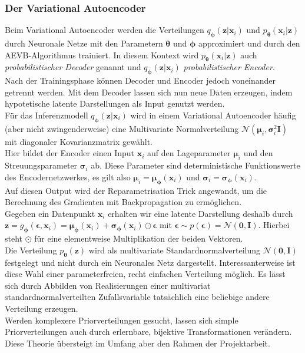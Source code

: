 \documentclass[12pt]{article}
\newcommand{\qenc}{q_{\boldsymbol\phi}(\mathbf{z}|\mathbf{x}_i)}
\newcommand{\pdec}{p_{\boldsymbol\theta}(\mathbf{x}_i|\mathbf{z})}
\newcommand{\z}{\mathbf{z}}
\begin{document}
	\subsubsection[Variational Autoencoder]{Der Variational Autoencoder}
	Beim Variational Autoencoder werden die Verteilungen $\qenc$ und $\pdec$ durch Neuronale Netze mit den Parametern $\boldsymbol\theta$ und $\boldsymbol\phi$ approximiert und durch den AEVB-Algorithmus trainiert. In diesem Kontext wird $\pdec$ auch \emph{probabilistischer Decoder} genannt und $\qenc$ \emph{probabilistischer Encoder}. \\
	Nach der Trainingsphase können Decoder und Encoder jedoch voneinander getrennt werden. Mit dem Decoder lassen sich nun neue Daten erzeugen, indem hypotetische latente Darstellungen als Input genutzt werden.\\
	Für das Inferenzmodell $\qenc$ wird in einem Variational Autoencoder häufig (aber nicht zwingenderweise) eine Multivariate Normalverteilung $\mathcal{N}(\boldsymbol\mu_{i},\boldsymbol\sigma_{i}^{2}\mathbf{I})$ mit diagonaler Kovarianzmatrix gewählt. \\
	Hier bildet
	der Encoder einen Input $\textbf{x}_{i}$ auf den Lageparameter $\boldsymbol\mu_{i}$ und den Streuungsparameter $\boldsymbol\sigma_{i}$ ab. Diese Parameter sind deterministische Funktionswerte des Encodernetzwerkes, es gilt also $\boldsymbol\mu_{i} = \boldsymbol\mu_{\boldsymbol\phi}(\textbf{x}_{i})$ und $\boldsymbol\sigma_{i} = \boldsymbol\sigma_{\boldsymbol\phi}(\textbf{x}_{i})$.\\
	Auf diesen Output wird der Reparametrisation Trick angewandt, um die Berechnung des Gradienten mit Backpropagation zu ermöglichen.\\
	Gegeben ein Datenpunkt $\textbf{x}_{i}$ erhalten wir eine latente Darstellung deshalb durch $\textbf{z} = g_{\boldsymbol\phi}(\boldsymbol\epsilon,\textbf{x}_{i})  =\boldsymbol\mu_{\boldsymbol\phi}(\textbf{x}_{i}) +\boldsymbol\sigma_{\boldsymbol\phi}(\textbf{x}_{i}) \odot \boldsymbol\epsilon$ mit $\boldsymbol\epsilon \sim p(\boldsymbol\epsilon) = \mathcal{N}(\textbf{0},\textbf{I})$. Hierbei steht $\odot$ für eine elementweise Multiplikation der beiden Vektoren.\\
	Die Verteilung $p_{\boldsymbol\theta}(\z)$ wird als multivariate Standardnormalverteilung $\mathcal{N}(\mathbf{0},\mathbf{I})$ festgelegt und nicht durch ein Neuronales Netz dargestellt. Interessanterweise ist diese Wahl einer parameterfreien, recht einfachen Verteilung möglich. Es lässt sich durch Abbilden von Realisierungen einer multivariat standardnormalverteilten Zufallsvariable tatsächlich eine beliebige andere Verteilung erzeugen.\\ Werden komplexere Priorverteilungen gesucht, lassen sich simple Priorverteilungen auch durch erlernbare, bijektive Transformationen verändern. Diese Theorie übersteigt im Umfang aber den Rahmen der Projektarbeit.
\end{document}

